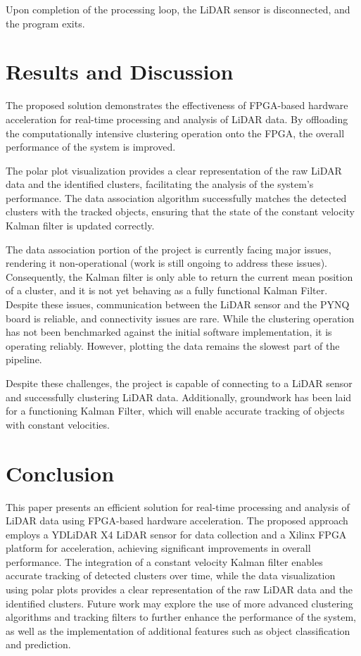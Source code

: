 \documentclass[journal]{IEEEtran} %
\begin{document}
Upon completion of the processing loop, the LiDAR sensor is disconnected, and the program exits.


\section{Results and Discussion}

The proposed solution demonstrates the effectiveness of FPGA-based hardware acceleration for real-time processing and analysis of LiDAR data. By offloading the computationally intensive clustering operation onto the FPGA, the overall performance of the system is improved.

The polar plot visualization provides a clear representation of the raw LiDAR data and the identified clusters, facilitating the analysis of the system's performance. The data association algorithm successfully matches the detected clusters with the tracked objects, ensuring that the state of the constant velocity Kalman filter is updated correctly.

The data association portion of the project is currently facing major issues, rendering it non-operational (work is still ongoing to address these issues). Consequently, the Kalman filter is only able to return the current mean position of a cluster, and it is not yet behaving as a fully functional Kalman Filter. Despite these issues, communication between the LiDAR sensor and the PYNQ board is reliable, and connectivity issues are rare. While the clustering operation has not been benchmarked against the initial software implementation, it is operating reliably. However, plotting the data remains the slowest part of the pipeline.

Despite these challenges, the project is capable of connecting to a LiDAR sensor and successfully clustering LiDAR data. Additionally, groundwork has been laid for a functioning Kalman Filter, which will enable accurate tracking of objects with constant velocities.

\section{Conclusion}

This paper presents an efficient solution for real-time processing and analysis of LiDAR data using FPGA-based hardware acceleration. The proposed approach employs a YDLiDAR X4 LiDAR sensor for data collection and a Xilinx FPGA platform for acceleration, achieving significant improvements in overall performance. The integration of a constant velocity Kalman filter enables accurate tracking of detected clusters over time, while the data visualization using polar plots provides a clear representation of the raw LiDAR data and the identified clusters. Future work may explore the use of more advanced clustering algorithms and tracking filters to further enhance the performance of the system, as well as the implementation of additional features such as object classification and prediction.
\end{document}
